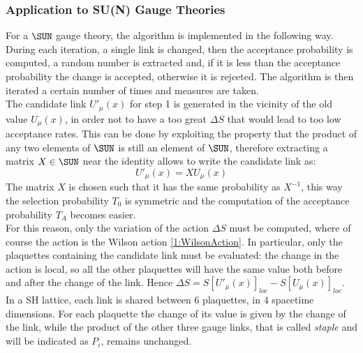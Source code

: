 \subsubsection{Application to SU(N) Gauge Theories}
For a $\SUN$ gauge theory, the algorithm is implemented in the following way.
During each iteration, a single link is changed, then the acceptance probability is computed, a random number is extracted and, if it is less than the acceptance probability the change is accepted, otherwise it is rejceted.
The algorithm is then iterated a certain number of times and measures are taken.\\
The candidate link $U'_\mu(x)$ for step 1 is generated in the vicinity of the old value $U_\mu(x)$, in order not to have a too great $\Delta S$ that would lead to too low acceptance rates.
This can be done by exploiting the property that the product of any two elements of $\SUN$ is still an element of $\SUN$, therefore extracting a matrix $X\in\SUN$ near the identity allows to write the candidate link as:
\begin{equation}
    U'_\mu(x) = XU_\mu(x) \label{2:MetropolisCandidateLink}
\end{equation}
The matrix $X$ is chosen such that it has the same probability as $X^{-1}$, this way the selection probability $T_0$ is symmetric and the computation of the acceptance probability $T_A$ becomes easier.\\
For this reason, only the variation of the action $\Delta S$ must be computed, where of course the action is the Wilson action \eqref{1:WilsonAction}.
In particular, only the plaquettes containing the candidate link must be evaluated: the change in the action is local, so all the other plaquettes will have the same value both before and after the change of the link.
Hence $\Delta S = S[U'_\mu(x)]_{loc}-S[U_\mu(x)]_{loc}$.\\
In a SH lattice, each link is shared between $6$ plaquettes, in $4$ spacetime dimensions.
For each plaquette the change of its value is given by the change of the link, while the product of the other three gauge links, that is called \emph{staple} and will be indicated as $P_i$, remains unchanged.\\

